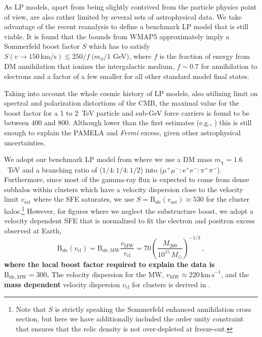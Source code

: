 \documentclass[10pt,aps,pra,reprint,amsmath,amsfonts,amssymb,showpacs,nofootinbib,floatfix]{revtex4-1}
\def\del#1{{}}
\def\C#1{{\bf #1}}
\newcommand{\Fermi}{{\em Fermi}\xspace}
\newcommand{\rmn}{\mathrm}
\newcommand{\sfe}{\rmn{sfe}}
\newcommand{\msun}{M_\odot}
\newcommand{\B}{\rmn{B}}
\newcommand{\sigv}{v_\rmn{cl}}
\newcommand{\mvir}{M_{200}}
\newcommand{\e}{\rmn{e}}
\begin{document}
As LP models, apart from being slightly contrived from the particle
physics point of view, are also rather limited by several sets of
astrophysical data. We take advantage of the recent reanalysis
\cite{Finkbeiner:2010sm} to define a benchmark LP model that is still
viable. It is found that the bounds from WMAP5 approximately imply a
Sommerfeld boost factor $S$ which has to satisfy $S(v\to
150\,\rmn{km}/\rmn{s})\lesssim 250/f\ (m_\phi/1$ GeV$)$, where $f$ is
the fraction of energy from DM annihilation that ionizes the
intergalactic medium, $f\sim 0.7$ for annihilation to electrons and a
factor of a few smaller for all other standard model final states.

Taking into account the whole cosmic history of LP models, also
utilizing limit on spectral and polarization distortions of the CMB,
the maximal value for the boost factor for a 1 to 2~TeV particle and
sub-GeV force carriers is found to be \cite{Finkbeiner:2010sm} between
400 and 800. Although lower than the first estimates (e.g.,
\cite{Bergstrom:2009fa,Meade:2009iu}) this is still enough to explain
the PAMELA and \Fermi excess, given other astrophysical uncertainties.

We adopt our benchmark LP model from \cite{Finkbeiner:2010sm} where we
use a DM mass $m_\chi=1.6$~TeV and a branching ratio of
($1/4:1/4:1/2$) into ($\mu^+\mu^-:\e^+\e^-:\pi^+\pi^-$). Furthermore,
since most of the gamma-ray flux is expected to come from dense
subhalos within clusters which have a velocity dispersion close to the
velocity limit $v_\rmn{sat}$ where the SFE saturates, we use
$S=\B_\sfe(v_\rmn{sat})\approx 530$ for the cluster
halos.\footnote{Note that $S$ is strictly speaking the Sommerfeld
  enhanced annihilation cross section, but here we have additionally
  included the order unity constraint that ensures that the relic
  density is not over-depleted at freeze-out.} However, for figures
where we neglect the substructure boost, we adopt a velocity dependent
SFE that is normalized to fit the electron and positron excess observed at
Earth\del{observed by the PAMELA and \Fermi satellites},
\begin{equation}
\B_\sfe(\sigv) = \B_\rmn{sfe,MW} \frac{v_\rmn{MW}}{\sigv} =
70 \left(\frac{\mvir}{10^{15}\,\msun}\right)^{-1/3}\,,
\label{eq:B_sfe}
\end{equation}
\C{where the local boost factor required to explain the data is
  $\B_\rmn{sfe,MW}=300$.} \del{Here the boost factor needed to explain
  the PAMELA/\Fermi excess of electrons and positrons
  $\B_\rmn{sfe,MW}=300$,} The velocity dispersion for the MW,
$v_\rmn{MW} \approx 220\,\rmn{km\,s}^{-1}$, and the \C{mass dependent}
velocity dispersion $\sigv$ for clusters is derived in
\cite{2005RvMP...77..207V}. \del{Note that, clusters have a larger velocity
dispersion and an accordingly smaller Sommerfeld boost factor.}
\end{document}
